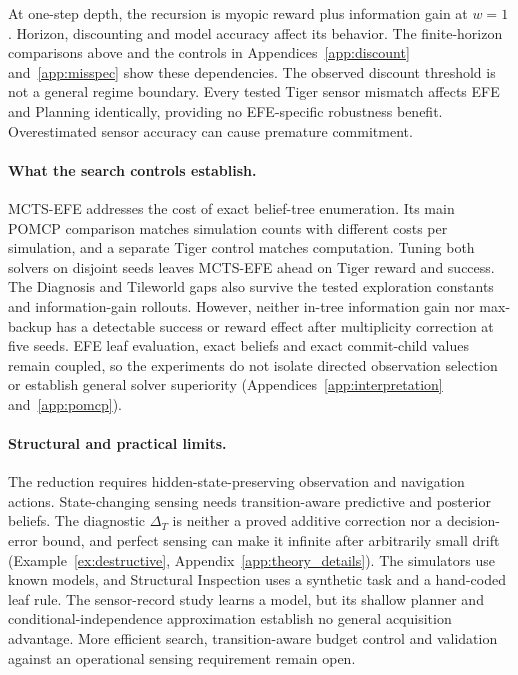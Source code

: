\documentclass[manuscript, screen, review]{jair}
\begin{document}
At one-step depth, the recursion is myopic reward plus information gain at $w=1$. Horizon, discounting and model accuracy affect its behavior. The finite-horizon comparisons above and the controls in Appendices~\ref{app:discount} and~\ref{app:misspec} show these dependencies. The observed discount threshold is not a general regime boundary. Every tested Tiger sensor mismatch affects EFE and Planning identically, providing no EFE-specific robustness benefit. Overestimated sensor accuracy can cause premature commitment.

\paragraph{What the search controls establish.}
MCTS-EFE addresses the cost of exact belief-tree enumeration. Its main POMCP comparison matches simulation counts with different costs per simulation, and a separate Tiger control matches computation. Tuning both solvers on disjoint seeds leaves MCTS-EFE ahead on Tiger reward and success. The Diagnosis and Tileworld gaps also survive the tested exploration constants and information-gain rollouts. However, neither in-tree information gain nor max-backup has a detectable success or reward effect after multiplicity correction at five seeds. EFE leaf evaluation, exact beliefs and exact commit-child values remain coupled, so the experiments do not isolate directed observation selection or establish general solver superiority (Appendices~\ref{app:interpretation} and~\ref{app:pomcp}).

\paragraph{Structural and practical limits.}
The reduction requires hidden-state-preserving observation and navigation actions. State-changing sensing needs transition-aware predictive and posterior beliefs. The diagnostic $\Delta_T$ is neither a proved additive correction nor a decision-error bound, and perfect sensing can make it infinite after arbitrarily small drift (Example~\ref{ex:destructive}, Appendix~\ref{app:theory_details}). The simulators use known models, and Structural Inspection uses a synthetic task and a hand-coded leaf rule. The sensor-record study learns a model, but its shallow planner and conditional-independence approximation establish no general acquisition advantage. More efficient search, transition-aware budget control and validation against an operational sensing requirement remain open.
\end{document}
